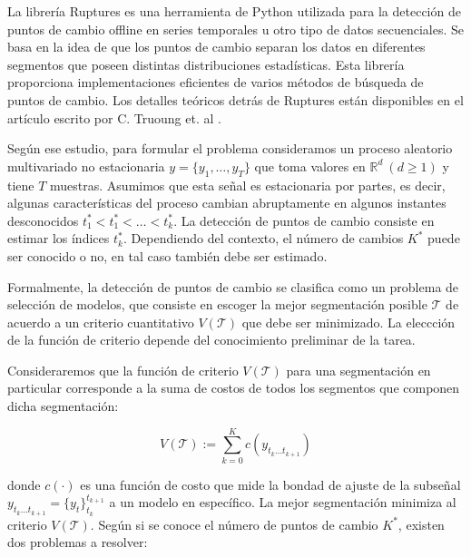\documentclass{article}[14pts]
\begin{document}
    La librería Ruptures es una herramienta de Python utilizada para la detección de puntos de cambio offline en series temporales u otro tipo de datos secuenciales. Se basa en la idea de que los puntos de cambio separan los datos en diferentes segmentos que poseen distintas distribuciones estadísticas. Esta librería proporciona implementaciones eficientes de varios métodos de búsqueda de puntos de cambio. Los detalles teóricos detrás de Ruptures están disponibles en el artículo escrito por C. Truoung et. al \cite{truong2020selective}.

    Según ese estudio, para formular el problema consideramos un proceso aleatorio multivariado no estacionaria $y= \{y_{1}, \dots, y_{T}\}$ que toma valores en $\mathbb{R}^{d} \ (d \geq 1)$ y tiene $T$ muestras. Asumimos que esta señal es estacionaria por partes, es decir, algunas características del proceso cambian abruptamente en algunos instantes desconocidos $t_{1}^{*} < t_{1}^{*} < \dots < t_{k}^{*}$. La detección de puntos de cambio consiste en estimar los índices $t_{k}^{*}$. Dependiendo del contexto, el número de cambios $K^{*}$ puede ser conocido o no, en tal caso también debe ser estimado.

    Formalmente, la detección de puntos de cambio se clasifica como un problema de selección de modelos, que consiste en escoger la mejor segmentación posible $\mathcal{T}$ de acuerdo a un criterio cuantitativo $V(\mathcal{T})$ que debe ser minimizado. La eleccción de la función de criterio depende del conocimiento preliminar de la tarea. 
    
    Consideraremos que la función de criterio $V(\mathcal{T})$ para una segmentación en particular corresponde a la suma de costos de todos los segmentos que componen dicha segmentación:

      \begin{equation*}
        V(\mathcal{T}) := \sum_{k=0}^{K} c(y_{t_{k}\dots t_{k+1}})
      \end{equation*}

    donde $c(\cdot)$ es una función de costo que mide la bondad de ajuste de la subseñal $y_{t_{k}\dots t_{k+1}} = \{y_{t}\}_{t_{k}}^{t_{k+1}}$ a un modelo en específico. La mejor segmentación minimiza al criterio $V(\mathcal{T})$. Según si se conoce el número de puntos de cambio $K^{*}$, existen dos problemas a resolver:
\end{document}
